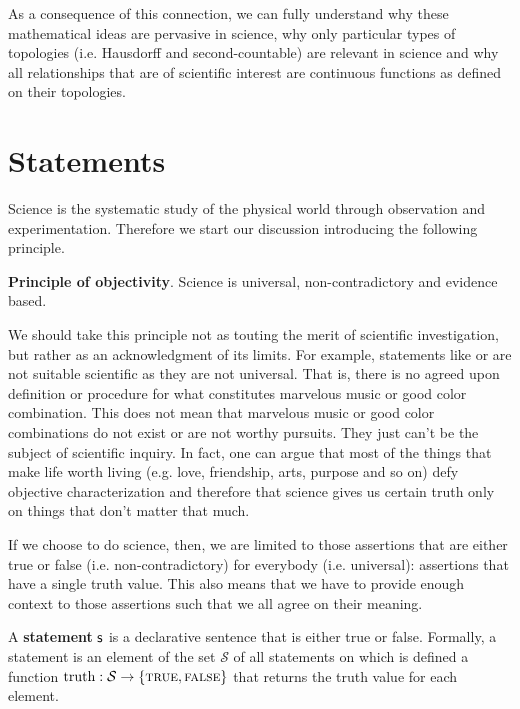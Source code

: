 \documentclass[11pt,letterpaper,fleqn]{memoir} %
\begin{document}
As a consequence of this connection, we can fully understand why these mathematical ideas are pervasive in science, why only particular types of topologies (i.e. Hausdorff and second-countable) are relevant in science and why all relationships that are of scientific interest are continuous functions as defined on their topologies.

\section{Statements}

Science is the systematic study of the physical world through observation and experimentation. Therefore we start our discussion introducing the following principle.

\begin{mathSection}
	\textbf{Principle of objectivity}.
		Science is universal, non-contradictory and evidence based.
\end{mathSection}

We should take this principle not as touting the merit of scientific investigation, but rather as an acknowledgment of its limits. For example, statements like  or  are not suitable scientific as they are not universal. That is, there is no agreed upon definition or procedure for what constitutes marvelous music or good color combination. This does not mean that marvelous music or good color combinations do not exist or are not worthy pursuits. They just can't be the subject of scientific inquiry. In fact, one can argue that most of the things that make life worth living (e.g. love, friendship, arts, purpose and so on) defy objective characterization and therefore that science gives us certain truth only on things that don't matter that much.

If we choose to do science, then, we are limited to those assertions that are either true or false (i.e. non-contradictory) for everybody (i.e. universal): assertions that have a single truth value. This also means that we have to provide enough context to those assertions such that we all agree on their meaning.

\begin{mathSection}

\begin{defn}\label{def_statement}
	A \textbf{statement} $\mathsf{s}$ is a declarative sentence that is either true or false. Formally, a statement is an element of the set $\mathcal{S}$ of all statements on which is defined a function $\operatorname{truth}: \mathcal{S} \to \{\textsc{true}, \textsc{false}\}$ that returns the truth value for each element.
\end{defn}

\end{mathSection}
\end{document}
